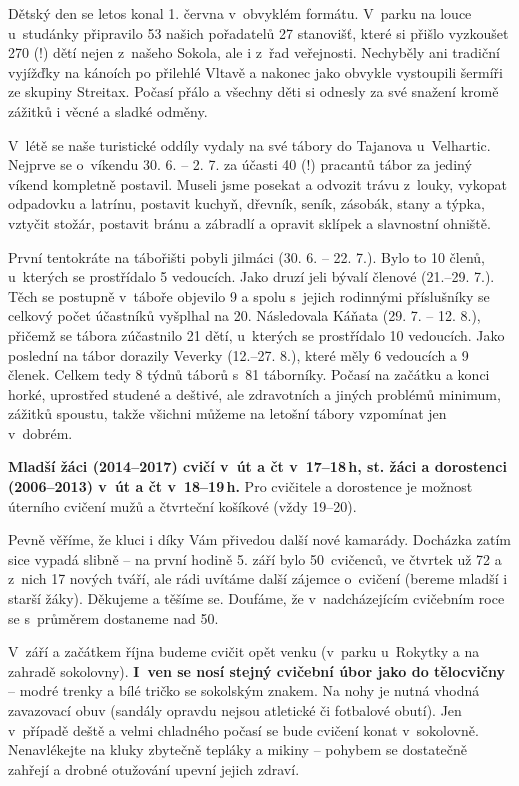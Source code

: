 \documentclass[11pt]{article}
\begin{document}
Dětský den se letos konal 1. června v~obvyklém formátu. V~parku na louce u~studánky připravilo 53 našich pořadatelů 27 stanovišť, které si přišlo vyzkoušet 270 (!) dětí nejen z~našeho Sokola, ale i z~řad veřejnosti. Nechyběly ani tradiční vyjížďky na kánoích po přilehlé Vltavě a nakonec jako obvykle vystoupili šermíři ze skupiny Streitax. Počasí přálo a všechny děti si odnesly za své snažení kromě zážitků i věcné a sladké odměny.

V~létě se naše turistické oddíly vydaly na své tábory do Tajanova u~Velhartic. 
Nejprve se o~víkendu 30. 6. – 2. 7. za účasti 40 (!) pracantů tábor za jediný víkend kompletně postavil. Museli jsme posekat a odvozit trávu z~louky, vykopat odpadovku a latrínu, postavit kuchyň, dřevník, seník, zásobák, stany a týpka, vztyčit stožár, postavit bránu a zábradlí a opravit sklípek a slavnostní ohniště.

První tentokráte na tábořišti pobyli jilmáci (30. 6. – 22. 7.). Bylo to 10 členů, u~kterých se prostřídalo 5 vedoucích. Jako druzí jeli bývalí členové (21.–29. 7.). Těch se postupně v~táboře objevilo 9 a spolu s~jejich rodinnými příslušníky se celkový počet účastníků vyšplhal na 20. Následovala Káňata (29. 7. – 12. 8.), přičemž se tábora zúčastnilo 21 dětí, u~kterých se prostřídalo 10 vedoucích. Jako poslední na tábor dorazily Veverky (12.–27. 8.), které měly 6 vedoucích a 9 členek. Celkem tedy 8 týdnů táborů s~81 táborníky. Počasí na začátku a konci horké, uprostřed studené a deštivé, ale zdravotních a jiných problémů minimum, zážitků spoustu, takže všichni můžeme na letošní tábory vzpomínat jen v~dobrém.

\textbf{Mladší žáci (2014–2017) cvičí v~út a čt v~17–18\,h, st. žáci a dorostenci (2006–2013) v~út a čt v~18–19\,h.} Pro cvičitele a dorostence je možnost úterního cvičení mužů a čtvrteční košíkové (vždy 19–20).

Pevně věříme, že kluci i díky Vám přivedou další nové kamarády. Docházka zatím sice vypadá slibně – na první hodině 5. září bylo 50~cvičenců, ve čtvrtek už 72 a z~nich 17 nových tváří, ale rádi uvítáme další zájemce o~cvičení (bereme mladší i starší žáky). Děkujeme a těšíme se. Doufáme, že v~nadcházejícím cvičebním roce se s~průměrem dostaneme nad 50.

V~září a začátkem října budeme cvičit opět venku (v~parku u~Rokytky a na zahradě sokolovny). \textbf{I~ven se nosí stejný cvičební úbor jako do tělocvičny} – modré trenky a bílé tričko se sokolským znakem. Na nohy je nutná vhodná zavazovací obuv (sandály opravdu nejsou atletické či fotbalové obutí). Jen v~případě deště a velmi chladného počasí se bude cvičení konat v~sokolovně. Nenavlékejte na kluky zbytečně tepláky a mikiny – pohybem se dostatečně zahřejí a drobné otužování upevní jejich zdraví.
\end{document}
